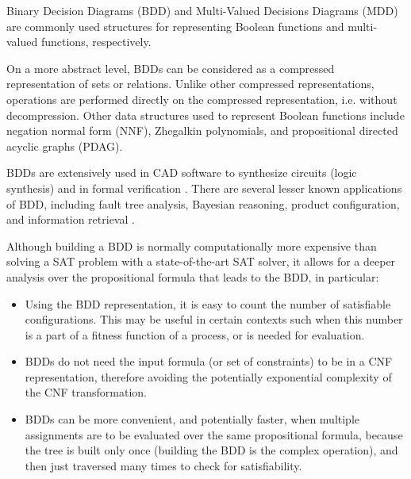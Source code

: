 Binary Decision Diagrams (BDD) and Multi-Valued Decisions Diagrams (MDD) are commonly used structures for representing Boolean functions and multi-valued functions, respectively. 

On a more abstract level, BDDs can be considered as a compressed representation of sets or relations. Unlike other compressed representations, operations are performed directly on the compressed representation, i.e. without decompression. Other data structures used to represent Boolean functions include negation normal form (NNF), Zhegalkin polynomials, and propositional directed acyclic graphs (PDAG).

BDDs are extensively used in CAD software to synthesize circuits (logic synthesis) and in formal verification \cite{bryant2018binary}. There are several lesser known applications of BDD, including fault tree analysis, Bayesian reasoning, product configuration, and information retrieval \cite{ge2015quantitative}.

Although building a BDD is normally computationally more expensive than solving a SAT problem with a state-of-the-art SAT solver, it allows for a deeper analysis over the propositional formula that leads to the BDD, in particular:
\begin{itemize}
	\item Using the BDD representation, it is easy to count the number of satisfiable configurations. This may be useful in certain contexts such when this number is a part of a fitness function of a process, or is needed for evaluation.
	\item BDDs do not need the input formula (or set of constraints) to be in a CNF representation, therefore avoiding the potentially exponential complexity of the CNF transformation.
	\item BDDs can be more convenient, and potentially faster, when multiple assignments are to be evaluated over the same propositional formula, because the tree is built only once (building the BDD is the complex operation), and then just traversed many times to check for satisfiability.
\end{itemize} 


